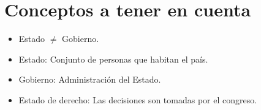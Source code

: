 \documentclass{templateNote}
\begin{document}

\portada
\margenes %
\tableofcontents
\newpage

\section{Conceptos a tener en cuenta}
\begin{itemize}
    \item Estado $\neq$ Gobierno.
    \item Estado: Conjunto de personas que habitan el país.
    \item Gobierno: Administración del Estado.
    \item Estado de derecho: Las decisiones son tomadas por el congreso. 
\end{itemize}
\end{document}
